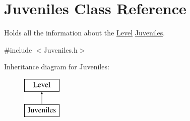 \hypertarget{class_juveniles}{}\section{Juveniles Class Reference}
\label{class_juveniles}


Holds all the information about the \hyperlink{class_level}{Level} \hyperlink{class_juveniles}{Juveniles}.  




{\ttfamily \#include $<$Juveniles.\+h$>$}

Inheritance diagram for Juveniles\+:\begin{figure}[H]
\begin{center}
\leavevmode
\includegraphics[height=2.000000cm]{class_juveniles}
\end{center}
\end{figure}
